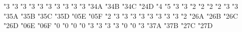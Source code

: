 \mathchardef \nsqsubseteq   "3
\mathchardef \nsqsupseteq   "3
\mathchardef \coloneqq   "3
\mathchardef \eqqcolon   "3
\mathchardef \coloneq   "3
\mathchardef \eqcolon   "3
\mathchardef \Coloneqq   "3
\mathchardef \Eqqcolon   "3
\mathchardef \Coloneq   "3
\mathchardef \Eqcolon   "3
\mathchardef \strictif   "3\txsycfam 4A
\mathchardef \strictfi   "3\txsycfam 4B
\mathchardef \strictiff   "3\txsycfam 4C
\mathchardef \invamp   "2\txsycfam 4D
\def \lbag {\delimiter"4\txsycfam 4E\txexafam 30 }
\def \rbag {\delimiter"5\txsycfam 4F\txexafam 31 }
\mathchardef \Lbag   "4
\mathchardef \Rbag   "5
\mathchardef \circledless   "3
\mathchardef \circledgtr   "3
\mathchardef \circledwedge   "2
\mathchardef \circledvee   "2
\mathchardef \circledbar   "2
\mathchardef \circledbslash   "2
\mathchardef \lJoin   "3
\mathchardef \rJoin   "3
\mathchardef \Join   "3\txsycfam 5A
\mathchardef \openJoin   "3\txsycfam 5B
\mathchardef \lrtimes   "3\txsycfam 5C
\mathchardef \opentimes   "3\txsycfam 5D
\mathchardef \Diamond   "0\txsycfam 5E
\mathchardef \Diamondblack   "0\txsycfam 5F
\mathchardef \nplus   "2
\mathchardef \nsqsubset   "3
\mathchardef \nsqsupset   "3
\mathchardef \dashleftarrow   "3
\mathchardef \dashrightarrow   "3
\mathchardef \dashleftrightarrow   "3
\mathchardef \leftsquigarrow   "3
\mathchardef \ntwoheadrightarrow   "3
\mathchardef \ntwoheadleftarrow   "3
\mathchardef \boxast   "2
\mathchardef \boxbslash   "2\txsycfam 6A
\mathchardef \boxbar   "2\txsycfam 6B
\mathchardef \boxslash   "2\txsycfam 6C
\mathchardef \Wr   "2\txsycfam 6D
\mathchardef \lambdaslash   "0\txsycfam 6E
\mathchardef \lambdabar   "0\txsycfam 6F
\mathchardef \varclubsuit   "0
\mathchardef \vardiamondsuit   "0
\mathchardef \varheartsuit   "0
\mathchardef \varspadesuit   "0
\mathchardef \Nearrow   "3
\mathchardef \Searrow   "3
\mathchardef \Nwarrow   "3
\mathchardef \Swarrow   "3
\mathchardef \Top   "0
\mathchardef \Bot   "0
\mathchardef \Perp   "3
\mathchardef \leadstoext   "3\txsycfam 7A
\mathchardef \leadsto   "3\txsycfam 7B
\mathchardef \sqcupplus   "2\txsycfam 7C
\mathchardef \sqcapplus   "2\txsycfam 7D
\def \llbracket {\delimiter"4\txsycfam 7E\txexafam 12 }
